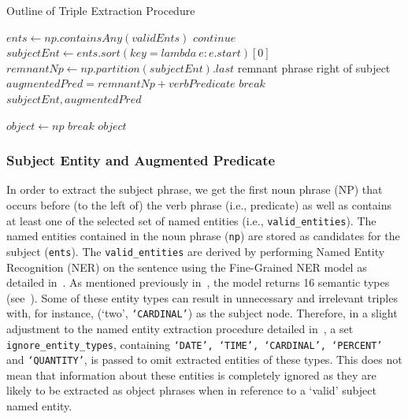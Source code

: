 \begin{algorithm}[H]
  \caption{Outline of Triple Extraction Procedure}
  \label{alg:subject_relation}
  \begin{algorithmic}   
    
      \State $ents \gets np.containsAny(validEnts)$ 
        \State $continue$
        \EndIf
      \State $subjectEnt \gets ents.sort(key = lambda \ e: e.start)[0]$
      \State $remnantNp \gets np.partition(subjectEnt).last$ 
      \Comment remnant phrase right of subject
      \State $augmentedPred = remnantNp + verbPredicate $
      \State $break$
      \EndIf
    \EndFor
    \State \Return $subjectEnt, augmentedPred$
  \EndFunction

      \State $object \gets np$ 
      \State $break$
      \EndIf
    \EndFor
    \State \Return $object$
  \EndFunction
\end{algorithmic}
\end{algorithm}

\vspace{-3ex}
\subsubsection{Subject Entity and Augmented Predicate} \label{s_aug_p}
In order to extract the subject phrase, we get the first noun phrase (NP) that occurs before (to the left of) the verb phrase (i.e., predicate) as well as contains at least one of the selected set of named entities (i.e., \texttt{valid\_entities}). The named entities contained in the noun phrase (\texttt{np}) are stored as candidates for the subject (\texttt{ents}). The \texttt{valid\_entities} are derived by performing Named Entity Recognition (NER) on the sentence using the Fine-Grained NER model as detailed in~. As mentioned previously in~, the model returns 16 semantic types (see~). Some of these entity types can result in unnecessary and irrelevant triples with, for instance, (`two', \texttt{`CARDINAL'}) as the subject node. Therefore, in a slight adjustment to the named entity extraction procedure detailed in~, a set \texttt{ignore\_entity\_types}, containing \texttt{`DATE', `TIME', `CARDINAL', `PERCENT'} and \texttt{`QUANTITY'}, is passed to omit extracted entities of these types. This does not mean that information about these entities is completely ignored as they are likely to be extracted as object phrases when in reference to a `valid' subject named entity. 

